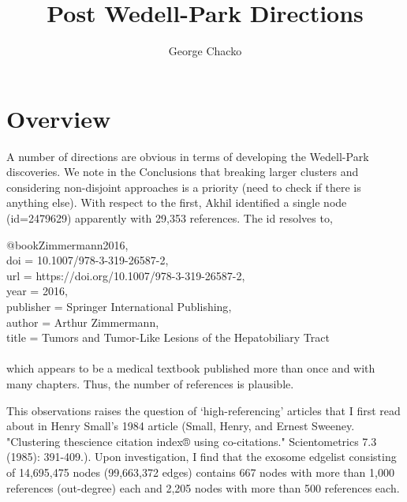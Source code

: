\documentclass[11pt, oneside]{article}   	%
\title{Post Wedell-Park Directions}
\author{George Chacko}
\begin{document}
\maketitle

\section*{Overview}

A number of directions are obvious in terms of developing the Wedell-Park discoveries. We note in the Conclusions that breaking larger clusters and considering non-disjoint approaches is a priority (need to check if there is anything else).
With respect to the first, Akhil identified a single node (id=2479629) apparently with 29,353 references. The id resolves to,\\

\par
\noindent
@book{Zimmermann2016, \\
  doi = {10.1007/978-3-319-26587-2}, \\
  url = {https://doi.org/10.1007/978-3-319-26587-2}, \\
  year = {2016}, \\
  publisher = {Springer International Publishing}, \\
  author = {Arthur Zimmermann}, \\
  title = {Tumors and Tumor-Like Lesions of the Hepatobiliary Tract} \\
} \\

\noindent which appears to be a medical textbook published more than once and with many chapters. Thus, the number of references is plausible. 

This observations raises the question of `high-referencing' articles that I first read about in  Henry Small's 1984 article (Small, Henry, and Ernest Sweeney. "Clustering thescience citation index® using co-citations." Scientometrics 7.3 (1985): 391-409.).  Upon investigation, I find that the exosome edgelist consisting of  14,695,475 nodes (99,663,372 edges)  contains 667 nodes with more than 1,000 references (out-degree) each and 2,205 nodes with more than 500 references each.
\end{document}
